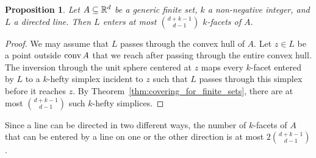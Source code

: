 \documentclass[10pt,a4paper]{article}
\newtheorem{proposition}{Proposition}[section]
\newcommand {\mm}[1] {\ifmmode{#1}\else{\mbox{\(#1\)}}\fi}
\theoremstyle{plain}
\newcommand{\Rspace}        {\mm{{\mathbb R}}}
\newcommand{\conv}[1]       {\mm{{\rm conv\,}{#1}}}
\begin{document}
\begin{proposition}
  \label{prop:exact_Lovasz_lemma}
  Let $A \subseteq \Rspace^d$ be a generic finite set, $k$ a non-negative integer, and $L$ a directed line. 
  Then $L$ enters at most $\binom{d+k-1}{d-1}$ $k$-facets of $A$.
\end{proposition}
\begin{proof}
  We may assume that $L$ passes through the convex hull of $A$.
  Let $z \in L$ be a point outside $\conv{A}$ that we reach after passing through the entire convex hull.
  The inversion through the unit sphere centered at $z$ maps every $k$-facet entered by $L$ to a $k$-hefty simplex incident to $z$ such that $L$ passes through this simplex before it reaches $z$.
  By Theorem~\ref{thm:covering_for_finite_sets}, there are at most $\binom{d+k-1}{d-1}$ such $k$-hefty simplices.
\end{proof}
Since a line can be directed in two different ways, the number of $k$-facets of $A$ that can be entered by a line on one or the other direction is at most $2 \binom{d+k-1}{d-1}$.
\end{document}
